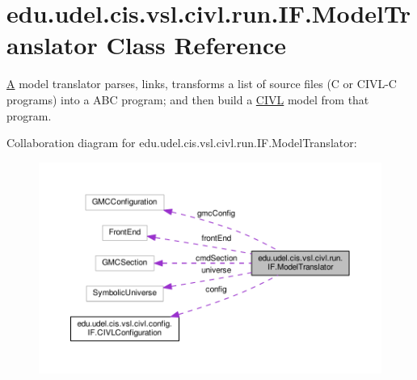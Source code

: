 \hypertarget{classedu_1_1udel_1_1cis_1_1vsl_1_1civl_1_1run_1_1IF_1_1ModelTranslator}{}\section{edu.\+udel.\+cis.\+vsl.\+civl.\+run.\+I\+F.\+Model\+Translator Class Reference}
\label{classedu_1_1udel_1_1cis_1_1vsl_1_1civl_1_1run_1_1IF_1_1ModelTranslator}


\hyperlink{structA}{A} model translator parses, links, transforms a list of source files (C or C\+I\+V\+L-\/\+C programs) into a A\+B\+C program; and then build a \hyperlink{classedu_1_1udel_1_1cis_1_1vsl_1_1civl_1_1CIVL}{C\+I\+V\+L} model from that program.  




Collaboration diagram for edu.\+udel.\+cis.\+vsl.\+civl.\+run.\+I\+F.\+Model\+Translator\+:
\nopagebreak
\begin{figure}[H]
\begin{center}
\leavevmode
\includegraphics[width=350pt]{classedu_1_1udel_1_1cis_1_1vsl_1_1civl_1_1run_1_1IF_1_1ModelTranslator__coll__graph}
\end{center}
\end{figure}
